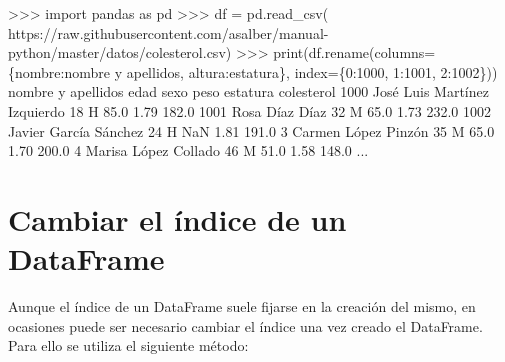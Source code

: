 \documentclass[
  spanish,
  a4paper,
]{scrreport}
\newenvironment{Shaded}{\begin{snugshade}}{\end{snugshade}}
\newcommand{\BuiltInTok}[1]{\textcolor[rgb]{0.00,0.23,0.31}{#1}}
\newcommand{\DecValTok}[1]{\textcolor[rgb]{0.68,0.00,0.00}{#1}}
\newcommand{\FloatTok}[1]{\textcolor[rgb]{0.68,0.00,0.00}{#1}}
\newcommand{\ImportTok}[1]{\textcolor[rgb]{0.00,0.46,0.62}{#1}}
\newcommand{\NormalTok}[1]{\textcolor[rgb]{0.00,0.23,0.31}{#1}}
\newcommand{\OperatorTok}[1]{\textcolor[rgb]{0.37,0.37,0.37}{#1}}
\newcommand{\StringTok}[1]{\textcolor[rgb]{0.13,0.47,0.30}{#1}}
\begin{document}
\begin{Shaded}
\begin{Highlighting}[]
\OperatorTok{\textgreater{}\textgreater{}\textgreater{}} \ImportTok{import}\NormalTok{ pandas }\ImportTok{as}\NormalTok{ pd}
\OperatorTok{\textgreater{}\textgreater{}\textgreater{}}\NormalTok{ df }\OperatorTok{=}\NormalTok{ pd.read\_csv(}
\StringTok{\textquotesingle{}https://raw.githubusercontent.com/asalber/manual{-}python/master/datos/colesterol.csv\textquotesingle{}}\NormalTok{)}
\OperatorTok{\textgreater{}\textgreater{}\textgreater{}} \BuiltInTok{print}\NormalTok{(df.rename(columns}\OperatorTok{=}\NormalTok{\{}\StringTok{\textquotesingle{}nombre\textquotesingle{}}\NormalTok{:}\StringTok{\textquotesingle{}nombre y apellidos\textquotesingle{}}\NormalTok{, }\StringTok{\textquotesingle{}altura\textquotesingle{}}\NormalTok{:}\StringTok{\textquotesingle{}estatura\textquotesingle{}}\NormalTok{\}, index}\OperatorTok{=}\NormalTok{\{}\DecValTok{0}\NormalTok{:}\DecValTok{1000}\NormalTok{, }\DecValTok{1}\NormalTok{:}\DecValTok{1001}\NormalTok{, }\DecValTok{2}\NormalTok{:}\DecValTok{1002}\NormalTok{\}))}
\NormalTok{                    nombre y apellidos  edad sexo    peso  estatura    colesterol}
\DecValTok{1000}\NormalTok{      José Luis Martínez Izquierdo    }\DecValTok{18}\NormalTok{    H    }\FloatTok{85.0}      \FloatTok{1.79}         \FloatTok{182.0}
\DecValTok{1001}\NormalTok{                    Rosa Díaz Díaz    }\DecValTok{32}\NormalTok{    M    }\FloatTok{65.0}      \FloatTok{1.73}         \FloatTok{232.0}
\DecValTok{1002}\NormalTok{             Javier García Sánchez    }\DecValTok{24}\NormalTok{    H     NaN      }\FloatTok{1.81}         \FloatTok{191.0}
\DecValTok{3}\NormalTok{                  Carmen López Pinzón    }\DecValTok{35}\NormalTok{    M    }\FloatTok{65.0}      \FloatTok{1.70}         \FloatTok{200.0}
\DecValTok{4}\NormalTok{                 Marisa López Collado    }\DecValTok{46}\NormalTok{    M    }\FloatTok{51.0}      \FloatTok{1.58}         \FloatTok{148.0}
\NormalTok{...}
\end{Highlighting}
\end{Shaded}

\section{Cambiar el índice de un
DataFrame}\label{cambiar-el-uxedndice-de-un-dataframe}

Aunque el índice de un DataFrame suele fijarse en la creación del mismo,
en ocasiones puede ser necesario cambiar el índice una vez creado el
DataFrame. Para ello se utiliza el siguiente método:
\end{document}

